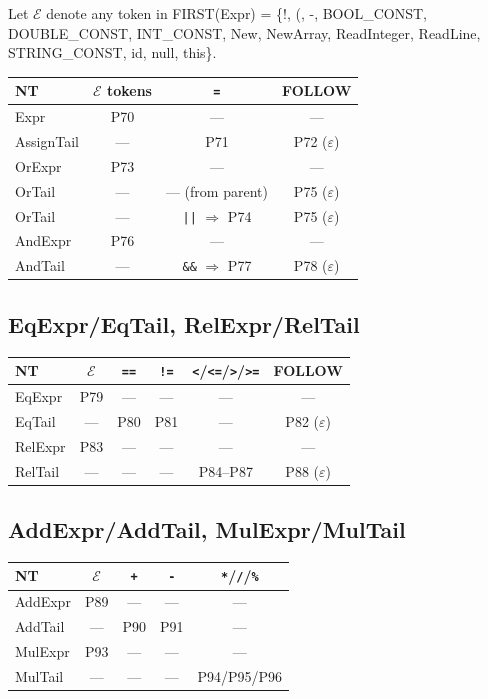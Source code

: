 \documentclass[12pt,a4paper]{article}
\begin{document}
Let $\mathcal{E}$ denote any token in FIRST(Expr) = \{!, (, -, BOOL\_CONST, DOUBLE\_CONST,
INT\_CONST, New, NewArray, ReadInteger, ReadLine, STRING\_CONST, id, null, this\}.

\begin{center}
\begin{tabular}{l|ccc}
\toprule
NT         & $\mathcal{E}$ tokens & \texttt{=} & FOLLOW \\
\midrule
Expr       & P70 & — & — \\
AssignTail & — & P71 & P72 ($\varepsilon$) \\
OrExpr     & P73 & — & — \\
OrTail     & — & — (from parent) & P75 ($\varepsilon$) \\
OrTail     & — & \texttt{||} $\Rightarrow$ P74 & P75 ($\varepsilon$) \\
AndExpr    & P76 & — & — \\
AndTail    & — & \texttt{\&\&} $\Rightarrow$ P77 & P78 ($\varepsilon$) \\
\bottomrule
\end{tabular}
\end{center}

\subsection{EqExpr/EqTail, RelExpr/RelTail}

\begin{center}
\begin{tabular}{l|ccccc}
\toprule
NT      & $\mathcal{E}$ & \texttt{==} & \texttt{!=} & \texttt{<}/\texttt{<=}/\texttt{>}/\texttt{>=} & FOLLOW \\
\midrule
EqExpr  & P79 & — & — & — & — \\
EqTail  & — & P80 & P81 & — & P82 ($\varepsilon$) \\
RelExpr & P83 & — & — & — & — \\
RelTail & — & — & — & P84--P87 & P88 ($\varepsilon$) \\
\bottomrule
\end{tabular}
\end{center}

\subsection{AddExpr/AddTail, MulExpr/MulTail}

\begin{center}
\begin{tabular}{l|cccc}
\toprule
NT      & $\mathcal{E}$ & \texttt{+} & \texttt{-} & \texttt{*}/\texttt{/}/\texttt{\%} \\
\midrule
AddExpr & P89 & — & — & — \\
AddTail & — & P90 & P91 & — \\
MulExpr & P93 & — & — & — \\
MulTail & — & — & — & P94/P95/P96 \\
\bottomrule
\end{tabular}
\end{center}
\end{document}
